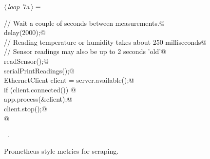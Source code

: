 \documentclass[a4paper, 12pt]{article}
\begin{document}
\begin{flushleft} \small
\begin{minipage}{\linewidth}\label{scrap9}\raggedright\small
{}$\langle\,${\itshape loop}\nobreak\ {\footnotesize{7a}}$\,\rangle\equiv$
\vspace{-1ex}
\begin{list}{}{\setlength{\leftmargin}{1em}} \item
\mbox{}\lstinline@  // Wait a couple of seconds between measurements.@\\
\mbox{}\lstinline@  delay(2000);@\\
\mbox{}\lstinline@  // Reading temperature or humidity takes about 250 milliseconds@\\
\mbox{}\lstinline@  // Sensor readings may also be up to 2 seconds 'old'@\\
\mbox{}\lstinline@  readSensor();@\\
\mbox{}\lstinline@  serialPrintReadings();@\\
\mbox{}\lstinline@  EthernetClient client = server.available();@\\
\mbox{}\lstinline@  if (client.connected()) {@\\
\mbox{}\lstinline@    app.process(&client);@\\
\mbox{}\lstinline@    client.stop();@\\
\mbox{}\lstinline@  }@\\
\mbox{}{\NWsep}
\end{list}
\vspace{-1ex}
\vspace{-1ex}
\footnotesize
\begin{list}{}{\setlength{\itemsep}{-\parsep}\setlength{\itemindent}{-\leftmargin}}
\item \NWtxtMacroRefIn\ .
\end{list}
\end{minipage}
\end{flushleft}

Prometheus style metrics for scraping.
\end{document}
